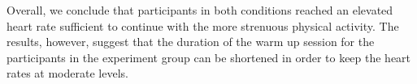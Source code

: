 Overall, we conclude that  participants in both conditions reached an elevated heart rate sufficient to continue with the more strenuous physical activity. The results, however, suggest that the duration  of the warm up session for the participants in the experiment group can be shortened in order to keep the heart rates at moderate levels. 
